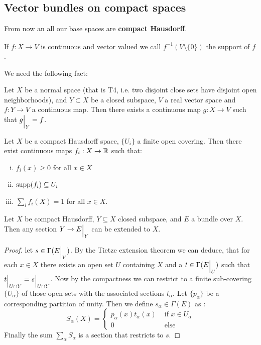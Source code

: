 \subsection{Vector bundles on compact spaces}
From now an all our base spaces are \textbf{compact Hausdorff}. 
\begin{definition}
	If $f:X\to V$ is continuous and vector valued we call $\overline{f^{-1}(V\setminus \{0\})}$ the support of $f$.
\end{definition}
We need the following fact:
\begin{fact}
	Let $X$ be a normal space (that is T4, i.e. two disjoint close sets have disjoint open neighborhoods), and $Y\subset X$ be a closed subspace, $V$ a real vector space and $f:Y\to V$ a continuous map. Then there exists a continuous map $g:X \to V$ such that ${g}\einsch{Y}=f$.
\end{fact}
\begin{fact}\label{thm: Existence of Partitions of Unity}
	Let $X$ be a compact Hausdorff space, $\{U_i\} $ a finite open covering. Then there exist continuous maps $f_i: X \to \mathbb{R}$ such that: 
	\begin{enumerate}[(i)]
		\item $f_i(x) \geq 0$ for all $x\in X$
		\item $\operatorname{\mathrm{supp}}(f_i)\subseteq U_i$
		\item $\sum_i f_i(X)=1$ for all $x\in X$.
	\end{enumerate}
\end{fact}
\begin{lemma}\label{lem: extension of sections}
	Let $X$ be compact Hausdorff, $Y\subseteq X$ closed subspace, and $E$ a bundle over $X$. Then any section $Y\to {E}\einsch{Y}$ can be extended to $X$.
\end{lemma}
\begin{proof}
	let $s\in \Gamma ({E}\einsch{Y})$. By the Tietze extension theorem we can deduce, that for each $x\in X$ there exists an open set $U$ containing $X$ and a $t\in \Gamma({E}\einsch{U})$ such that ${t}\einsch{U\cap Y}={s}\einsch{U\cap Y}$. Now by the compactness we can restrict to a finite sub-covering $\{U_{\alpha}\}$ of those open sets with the associated sections $t_{\alpha}$. Let $\{p_{\alpha}\}$ be a corresponding partition of unity. Then we define $s_{\alpha}\in \Gamma(E)$ as :
	\begin{equation*}
		S_{\alpha}(X)=\begin{cases}
			p_{\alpha}(x)t_{\alpha}(x) & \text{ if $x\in U_{\alpha}$} \\
			0 & \text{ else}
		\end{cases}
	\end{equation*}
	Finally the sum $\sum_{\alpha}S_{\alpha}$ is a section that restricts to $s$.
\end{proof}
